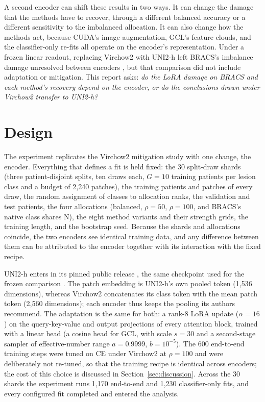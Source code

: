 \documentclass[11pt]{article}
\begin{document}
A second encoder can shift these results in two ways. It can change the damage that the methods have to recover, through a different balanced accuracy or a different sensitivity to the imbalanced allocation. It can also change how the methods act, because CUDA's image augmentation, GCL's feature clouds, and the classifier-only re-fits all operate on the encoder's representation. Under a frozen linear readout, replacing Virchow2 with UNI2-h \citep{chen2024uni,mahmoodlab2025uni2h} left BRACS's imbalance damage unresolved between encoders \citep{queisler2026encoderTransfer}, but that comparison did not include adaptation or mitigation. This report asks: \emph{do the LoRA damage on BRACS and each method's recovery depend on the encoder, or do the conclusions drawn under Virchow2 transfer to UNI2-h?}

\section{Design}
\label{sec:design}
The experiment replicates the Virchow2 mitigation study \citep{queisler2026mitigationBracs} with one change, the encoder. Everything that defines a fit is held fixed: the 30 split-draw shards (three patient-disjoint splits, ten draws each, $G=10$ training patients per lesion class and a budget of 2,240 patches), the training patients and patches of every draw, the random assignment of classes to allocation ranks, the validation and test patients, the four allocations (balanced, $\rho=50$, $\rho=100$, and BRACS's native class shares N), the eight method variants and their strength grids, the training length, and the bootstrap seed. Because the shards and allocations coincide, the two encoders see identical training data, and any difference between them can be attributed to the encoder together with its interaction with the fixed recipe.

UNI2-h enters in its pinned public release \citep{mahmoodlab2025uni2h}, the same checkpoint used for the frozen comparison \citep{queisler2026encoderTransfer}. The patch embedding is UNI2-h's own pooled token (1,536 dimensions), whereas Virchow2 concatenates its class token with the mean patch token (2,560 dimensions); each encoder thus keeps the pooling its authors recommend. The adaptation is the same for both: a rank-8 LoRA update ($\alpha=16$) on the query-key-value and output projections of every attention block, trained with a linear head (a cosine head for GCL, with scale $s=30$ and a second-stage sampler of effective-number range $a=0.9999$, $b=10^{-5}$). The 600 end-to-end training steps were tuned on CE under Virchow2 at $\rho=100$ and were deliberately not re-tuned, so that the training recipe is identical across encoders; the cost of this choice is discussed in Section~\ref{sec:discussion}. Across the 30 shards the experiment runs 1,170 end-to-end and 1,230 classifier-only fits, and every configured fit completed and entered the analysis.
\end{document}

